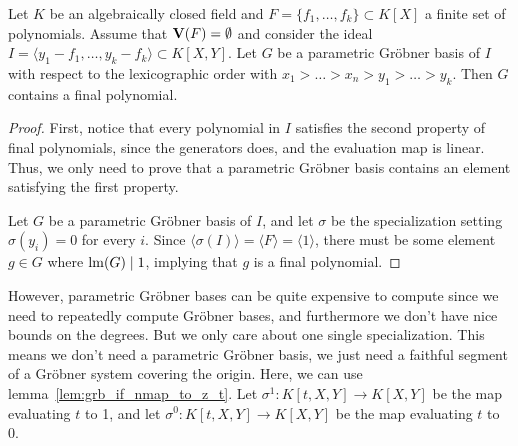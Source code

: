 \begin{theorem}
  Let $K$ be an algebraically closed field and $F = \{f_{1}, \dots, f_{k}\} \subset K[X]$ a finite set of polynomials. Assume that $\operatorname{\mathbf V}(F) = \emptyset$ and consider the ideal $I = \langle y_{1} - f_{1}, \dots, y_{k} - f_{k} \rangle \subset K[X, Y]$. Let $G$ be a parametric Gröbner basis of $I$ with respect to the lexicographic order with $x_{1} > \dots > x_{n} > y_{1} > \dots > y_{k}$. Then $G$ contains a final polynomial.
\end{theorem}
\begin{proof}
  First, notice that every polynomial in $I$ satisfies the second property of final polynomials, since the generators does, and the evaluation map is linear. Thus, we only need to prove that a parametric Gröbner basis contains an element satisfying the first property.

  Let $G$ be a parametric Gröbner basis of $I$, and let $\sigma$ be the specialization setting $\sigma(y_{i}) = 0$ for every $i$. Since $\langle \sigma(I) \rangle = \langle F \rangle = \langle 1 \rangle$, there must be some element $g \in G$ where $\operatorname{lm}(G) \mid 1$, implying that $g$ is a final polynomial.
\end{proof}

However, parametric Gröbner bases can be quite expensive to compute since we need to repeatedly compute Gröbner bases, and furthermore we don't have nice bounds on the degrees. But we only care about one single specialization. This means we don't need a parametric Gröbner basis, we just need a faithful segment of a Gröbner system covering the origin. Here, we can use lemma~\ref{lem:grb_if_nmap_to_z_t}. Let $\sigma^{1} : K[t, X, Y] \to K[X, Y]$ be the map evaluating $t$ to 1, and let $\sigma^{0} : K[t, X, Y] \to K[X, Y]$ be the map evaluating $t$ to 0.


